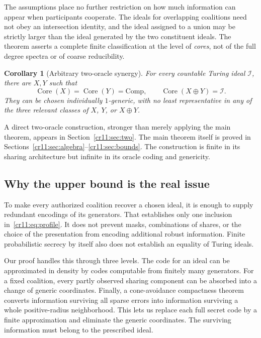 \documentclass[11pt,letterpaper]{article}
\theoremstyle{plain}
\newtheorem{corollary}[theorem]{Corollary}
\theoremstyle{definition}
\theoremstyle{remark}
\numberwithin{equation}{section}
\newcommand{\Core}{\operatorname{Core}}
\newcommand{\Comp}{\mathrm{Comp}}
\newcommand{\join}{\mathbin{\oplus}}
\newcommand{\I}{\mathcal I}
\begin{document}
The assumptions place no further restriction on how much information can
appear when participants cooperate. The ideals for overlapping coalitions
need not obey an intersection identity, and the ideal assigned to a union
may be strictly larger than the ideal generated by the two constituent
ideals. The theorem asserts a complete finite classification at the level
of \emph{cores}, not of the full degree spectra or of coarse reducibility.

\begin{corollary}[Arbitrary two-oracle synergy]\label{cr11:cor:synergyintro}
For every countable Turing ideal $\I$, there are $X,Y$ such that
\[
 \Core(X)=\Core(Y)=\Comp,\qquad \Core(X\join Y)=\I.
\]
They can be chosen individually $1$-generic, with no least representative in
any of the three relevant classes of $X$, $Y$, or $X\join Y$.
\end{corollary}

A direct two-oracle construction, stronger than merely applying the main
theorem, appears in Section~\ref{cr11:sec:two}. The main theorem itself is proved
in Sections~\ref{cr11:sec:algebra}--\ref{cr11:sec:bounds}. The construction is finite
in its sharing architecture but infinite in its oracle coding and genericity.

\subsection{Why the upper bound is the real issue}

To make every authorized coalition recover a chosen ideal, it is enough to
supply redundant encodings of its generators. That establishes only one
inclusion in~\eqref{cr11:eq:profile}. It does not prevent masks, combinations of
shares, or the choice of the presentation from encoding additional robust
information. Finite probabilistic secrecy by itself also does not establish
an equality of Turing ideals.

Our proof handles this through three levels. The code for an ideal can be
approximated in density by codes computable from finitely many generators.
For a fixed coalition, every partly observed sharing component can be
absorbed into a change of generic coordinates. Finally, a cone-avoidance
compactness theorem converts information surviving all sparse errors into
information surviving a whole positive-radius neighborhood. This lets us
replace each full secret code by a finite approximation and eliminate the
generic coordinates. The surviving information must belong to the prescribed
ideal.
\end{document}
